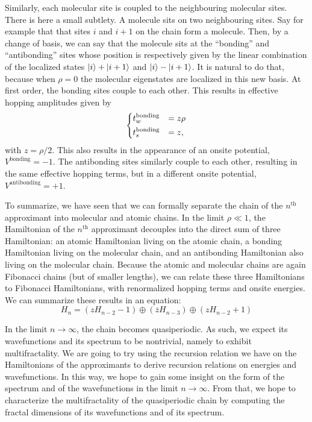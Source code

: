 \documentclass[11pt]{article}
\newcommand{\zb}{\ensuremath{\overline{z}}}
\begin{document}
Similarly, each molecular site is coupled to the neighbouring molecular sites. 
There is here a small subtlety. A molecule sits on two neighbouring sites. Say for example that that sites $i$ and $i+1$ on the chain form a molecule.
Then, by a change of basis, we can say that the molecule sits at the ``bonding'' and ``antibonding'' sites whose position is respectively given by the linear combination of the localized states $\ket{i} + \ket{i+1}$ and $\ket{i} - \ket{i+1}$.
It is natural to do that, because when $\rho = 0$ the molecular eigenstates are localized in this new basis.
At first order, the bonding sites couple to each other. 
This results in effective hopping amplitudes given by
\begin{equation}
	\begin{dcases}
	t^\text{bonding}_w &= z \rho\\
	t^\text{bonding}_s &= z,
	\end{dcases}
\end{equation}
with $z = \rho/2$. This also results in the appearance of an onsite potential, $V^\text{bonding}  = -1$. 
The antibonding sites similarly couple to each other, resulting in the same effective hopping terms, but in a different onsite potential, $V^\text{antibonding} = +1$.

To summarize, we have seen that we can formally separate the chain of the $n^\text{th}$ approximant into molecular and atomic chains.
In the limit $\rho \ll 1$, the Hamiltonian of the $n^\text{th}$ approximant decouples into the direct sum of three Hamiltonian: an atomic Hamiltonian living on the atomic chain, a bonding Hamiltonian living on the molecular chain, and an antibonding Hamiltonian also living on the molecular chain. 
Because the atomic and molecular chains are again Fibonacci chains (but of smaller lengths), we can relate these three Hamiltonians to Fibonacci Hamiltonians, with renormalized hopping terms and onsite energies.
We can summarize these results in an equation:
\begin{equation}
	H_n = \left( z H_{n-2} - 1 \right) \oplus \left( \zb H_{n-3} \right) \oplus \left( z H_{n-2} + 1 \right) 
\end{equation}

In the limit $n \rightarrow \infty$, the chain becomes quasiperiodic. As such, we expect its wavefunctions and its spectrum to be nontrivial, namely to exhibit multifractality.
We are going to try using the recursion relation we have on the Hamiltonians of the approximants to derive recursion relations on energies and wavefunctions. In this way, we hope to gain some insight on the form of the spectrum and of the wavefunctions in the limit $n \rightarrow \infty$.
From that, we hope to characterize the multifractality of the quasiperiodic chain by computing the fractal dimensions of its wavefunctions and of its spectrum.
\end{document}
